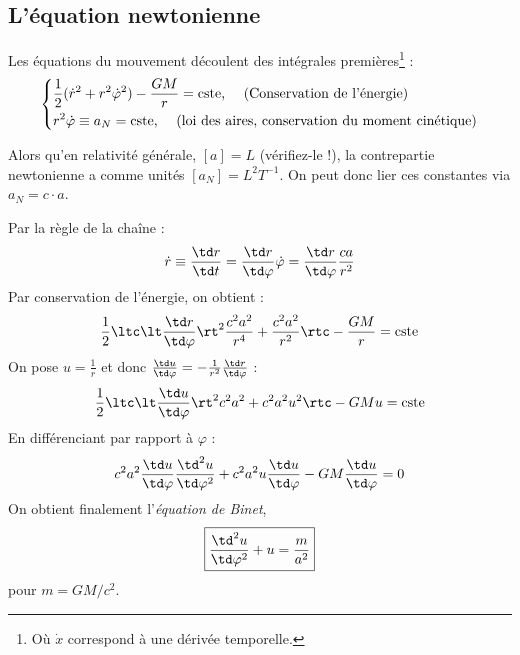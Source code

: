 \subsection{L'équation newtonienne}
Les équations du mouvement découlent des intégrales premières\footnote{Où $\dot{x}$ correspond à une dérivée temporelle.} : 
\begin{align}
    \begin{dcases}
        \frac{1}{2} (\dot{r}^2 + r^2 \dot{\varphi}^2 ) - \frac{GM}{r} = \text{cste, \quad (Conservation de l'énergie)} \\
        r^2 \dot{\varphi} \equiv a_N = \text{cste, \quad (loi des aires, conservation du moment cinétique)}
    \end{dcases}
\end{align}
\begin{rmk}
    Alors qu'en relativité générale, $[a] = L$ (vérifiez-le !), la contrepartie newtonienne a comme unités $[a_N] = L^2 T^{-1}$. On peut donc lier ces constantes via $a_N = c\cdot a$.
\end{rmk}
Par la règle de la chaîne :
\begin{equation}
    \dot{r} \equiv \frac{\td r}{ \td t} = \frac{\td r}{\td \varphi} \dot{\varphi} = \frac{\td r}{\td \varphi} \frac{c a}{r^2}
\end{equation}
Par conservation de l'énergie, on obtient :
\begin{equation}
    \frac{1}{2} \ltc \lt \frac{\td r}{\td \varphi}\rt^2 \frac{c^2a^2}{r^4} + \frac{c^2a^2}{r^2} \rtc - \frac{GM}{r} = \text{cste} 
\end{equation}
On pose $u = \frac{1}{r}$ et donc $\frac{\td u}{\td \varphi} = - \frac{1}{r^2} \frac{\td r}{\td \varphi}$ :
\begin{equation}
    \frac{1}{2} \ltc \lt \frac{\td u}{\td \varphi}\rt^2 c^2 a^2 + c^2a^2 u^2 \rtc - GM u = \text{cste} 
\end{equation}
En différenciant par rapport à $\varphi$ :
\begin{equation}
    c^2 a^2 \frac{\td u}{\td \varphi} \frac{\td^2 u}{\td \varphi^2} + c^2 a^2 u \frac{\td u}{\td \varphi} - GM \frac{\td u}{\td \varphi}  =0
\end{equation}
On obtient finalement l'\emph{équation de Binet},
\begin{align}
    \label{équation de Binet}
    \boxed{\frac{\td^2u}{\td \varphi^2} + u = \frac{m}{a^2}}
\end{align}
pour $m = GM/c^2$.
